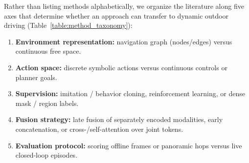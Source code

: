 Rather than listing methods alphabetically, we organize the literature along five axes that determine whether an approach can transfer to dynamic outdoor driving (Table~\ref{table:method_taxonomy}):

\begin{enumerate}
    \item \textbf{Environment representation:} navigation graph (nodes/edges) versus continuous free space.
    \item \textbf{Action space:} discrete symbolic actions versus continuous controls or planner goals.
    \item \textbf{Supervision:} imitation / behavior cloning, reinforcement learning, or dense mask / region labels.
    \item \textbf{Fusion strategy:} late fusion of separately encoded modalities, early concatenation, or cross-/self-attention over joint tokens.
    \item \textbf{Evaluation protocol:} scoring offline frames or panoramic hops versus live closed-loop episodes.
\end{enumerate}

